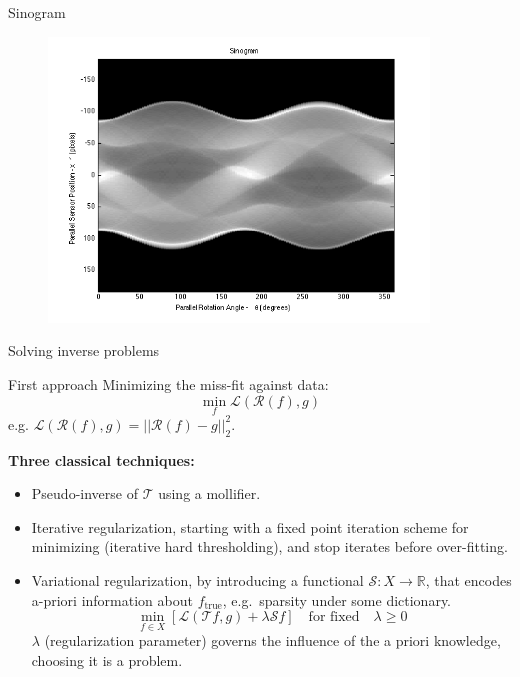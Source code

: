 \begin{frame}{Sinogram}
\begin{figure}[!tbp]
\includegraphics[width=0.9\textwidth]{../sinogram.png}
\end{figure}
\end{frame}

\begin{frame}{Solving inverse problems}
\begin{block}{First approach}
Minimizing the miss-fit against data:
$$
\min_{f} \mathcal{L}(\mathcal{R}(f),g)
$$
e.g. $\mathcal{L}(\mathcal{R}(f),g)=||\mathcal{R}(f)-g||_2^2$.
\end{block}

\textbf{Three classical techniques:}
\begin{itemize}
\item Pseudo-inverse of $\mathcal{T}$ using a mollifier.
\item Iterative regularization, starting with a fixed point iteration scheme for minimizing (iterative hard thresholding), and stop iterates before over-fitting.
\item Variational regularization, by introducing a functional $\mathcal{S}:X\longrightarrow \mathbb{R}$, that encodes a-priori information about $f_{\text{true}}$, e.g.\ sparsity under some dictionary.
$$
\min_{f\in X} [\mathcal{L}(\mathcal{T}f,g)+\lambda \mathcal{S}f] \quad \text{for fixed}\quad \lambda\geq 0
$$
$\lambda$ (regularization parameter) governs the influence of the a priori knowledge, choosing it is a problem.
\end{itemize}
\end{frame}

